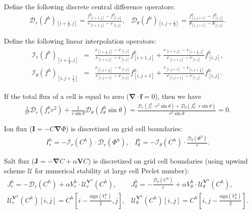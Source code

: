 \documentclass[10pt]{ijnam}
\newcommand{\sign}{\ensuremath{\mathrm{sign}}}
\newcommand{\pars}[1]{\left(#1\right)}
\newcommand{\half}{\frac{1}{2}}
\newcommand\bnabla{\boldsymbol{\nabla}}
\newcommand\bV{\boldsymbol{V}}
\newcommand\bI{\boldsymbol{I}}
\newcommand\bJ{\boldsymbol{J}}
\newcommand\cI{\mathcal{I}}
\newcommand\cD{\mathcal{D}}
\begin{document}
Define the following discrete central difference operators:
\begin{eqnarray*}
\cD_r(f^h){}_{\left[i+\half,j\right]} = \frac{f^h_{\left[i+1,j\right]} - f^h_{\left[i,j\right]}}
                       {r_{\left[i+1,j\right]} - r_{\left[i,j\right]}}, &
\cD_\theta(f^h){}_{\left[i,j+\half\right]} = \frac{f^h_{\left[i,j+1\right]} - f^h_{\left[i,j\right]}}
					   {\theta_{\left[i,j+1\right]} - \theta_{\left[i,j\right]}}.
\end{eqnarray*}

Define the following linear interpolation operators:
\begin{eqnarray*}
\begin{array}{rcl}
\cI_r(f^h)_{\left[i+\half,j\right]} &=& 
\frac{r_{\left[i+\half,j\right]} - r_{\left[i,j\right]}}
{r_{\left[i+1,j\right]} - r_{\left[i,j\right]}} 
f^h_{\left[i+1,j\right]} 
+ 
\frac{r_{\left[i+1,j\right]} - r_{\left[i+\half,j\right]}}
{r_{\left[i+1,j\right]} - r_{\left[i,j\right]}}
f^h_{\left[i,j\right]},
\\
\cI_\theta(f^h)_{\left[i,j+\half\right]} &=& 
\frac{r_{\left[i,j+\half\right]} - r_{\left[i,j\right]}}
{r_{\left[i,j+1\right]} - r_{\left[i,j\right]}}
  f^h_{\left[i,j+1\right]} + 
\frac{ r_{\left[i,j+1\right]} - r_{\left[i,j+\half\right]}}
{r_{\left[i,j+1\right]} - r_{\left[i,j\right]}}
  f^h_{\left[i,j\right]}.
\end{array}
\end{eqnarray*}

If the total flux of a cell is equal to zero ($\bnabla \cdot \boldsymbol{f} = 0$), then we have
\begin{eqnarray*}
\frac{1}{r^2} \cD_r\pars{f^h_r r^2} + 
\frac{1}{r \sin\theta} \cD_\theta\pars{f^h_\theta \sin\theta} =
\frac{\cD_r\pars{f^h_r \cdot r^2 \sin\theta} + 
\cD_\theta\pars{f^h_\theta \cdot r \sin\theta}}{r^2 \sin\theta} = 0. 
\end{eqnarray*}

Ion flux ($\bI = - C \bnabla \varPhi$) is discretized on grid cell boundaries:
\begin{eqnarray*}
I^h_r = -\cI_r(C^h) \cdot \cD_r(\varPhi^h), &
I^h_\theta = -\cI_\theta(C^h) \cdot \frac{\cD_\theta(\varPhi^h)}{r}.
\end{eqnarray*}

Salt flux ($\bJ = -\bnabla C + \alpha \bV C$) is discretized on grid cell boundaries 
(using upwind scheme $\mathcal{U}$ for numerical stability at large cell Peclet number):
\begin{eqnarray*}
J^h_r = -\cD_r(C^h) + \alpha V^h_r \cdot \mathcal{U}^{\bV^h}_r (C^h), &
J^h_\theta = -\frac{\cD_\theta(C^h)}{r} + \alpha V^h_\theta \cdot \mathcal{U}^{\bV^h}_\theta (C^h), 
\\
 \mathcal{U}^{\bV^h}_r(C^h)[i,j] = C^h\left[i-\frac{\sign(V^h_r)}{2}, j\right], &
 \mathcal{U}^{\bV^h}_\theta(C^h)[i,j] = C^h\left[i, j-\frac{\sign(V^h_\theta)}{2}\right]. 
\end{eqnarray*}
\end{document}
